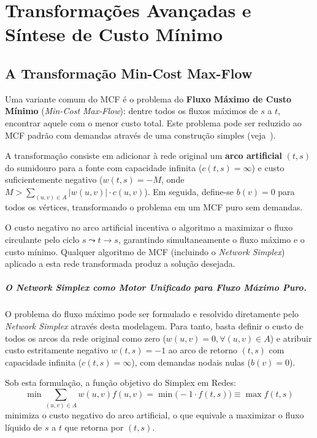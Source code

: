 \chapter{Transformações Avançadas e Síntese de Custo Mínimo}\label{sec:mcf_comparacao}

\section{A Transformação Min-Cost Max-Flow}
\label{sec:mcmf}

Uma variante comum do MCF é o problema do \textbf{Fluxo Máximo de Custo Mínimo} (\textit{Min-Cost Max-Flow}): dentre todos os fluxos máximos de $s$ a $t$, encontrar aquele com o menor custo total. Este problema pode ser reduzido ao MCF padrão com demandas através de uma construção simples (veja~\cite{ahuja1993network}).

A transformação consiste em adicionar à rede original um \textbf{arco artificial} $(t, s)$ do sumidouro para a fonte com capacidade infinita ($c(t,s) = \infty$) e custo suficientemente negativo ($w(t,s) = -M$, onde $M > \sum_{(u,v) \in A} |w(u,v)| \cdot c(u,v)$). Em seguida, define-se $b(v) = 0$ para todos os vértices, transformando o problema em um MCF puro sem demandas.

O custo negativo no arco artificial incentiva o algoritmo a maximizar o fluxo circulante pelo ciclo $s \leadsto t \to s$, garantindo simultaneamente o fluxo máximo e o custo mínimo. Qualquer algoritmo de MCF (incluindo o \textit{Network Simplex}) aplicado a esta rede transformada produz a solução desejada.

\paragraph{O Network Simplex como Motor Unificado para Fluxo Máximo Puro.}
O problema do fluxo máximo pode ser formulado e resolvido diretamente pelo \textit{Network Simplex} através desta modelagem. Para tanto, basta definir o custo de todos os arcos da rede original como zero ($w(u,v) = 0, \forall (u,v) \in A$) e atribuir custo estritamente negativo $w(t,s) = -1$ ao arco de retorno $(t,s)$ com capacidade infinita ($c(t,s) = \infty$), com demandas nodais nulas ($b(v) = 0$).

Sob esta formulação, a função objetivo do Simplex em Redes:
\begin{equation}
    \min \sum_{(u,v) \in A} w(u,v) f(u,v) = \min \big( -1 \cdot f(t,s) \big) \equiv \max f(t,s)
\end{equation}
minimiza o custo negativo do arco artificial, o que equivale a maximizar o fluxo líquido de $s$ a $t$ que retorna por $(t,s)$.

